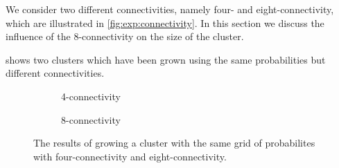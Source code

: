 We consider two different connectivities, namely four- and eight-connectivity, which are illustrated in \cref{fig:exp:connectivity}. In this section we discuss the influence of the 8-connectivity on the size of the cluster.

 shows two clusters which have been grown using the same probabilities but different connectivities. 

\begin{figure}
	\centering
	\begin{subfigure}{0.45\columnwidth}
		\centering
		\missingfigure{}
		\caption{4-connectivity}
		\label{fig:exp:connectivity:fourConnect}
	\end{subfigure}
	\begin{subfigure}{0.45\columnwidth}
		\centering
		\missingfigure{}
		\caption{8-connectivity}
		\label{fig:exp:connectivity:eightConnect}
	\end{subfigure}	
	\caption{The results of growing a cluster with the same grid of probabilites with  four-connectivity and  eight-connectivity.}
	\label{fig:exp:connectivityResults}
\end{figure}

